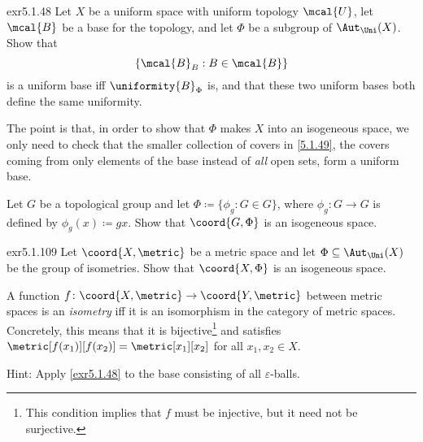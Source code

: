 \begin{exr}{}{exr5.1.48}
Let $X$ be a uniform space with uniform topology $\mcal{U}$, let $\mcal{B}$ be a base for the topology, and let $\Phi$ be a subgroup of $\Aut _{\Uni}(X)$.  Show that
\begin{equation}\label{5.1.49}
\left\{ \mcal{B}_B:B\in \mcal{B}\right\}
\end{equation}
is a uniform base iff $\uniformity{B}_\Phi$ is, and that these two uniform bases both define the same uniformity.
\begin{rmk}
The point is that, in order to show that $\Phi$ makes $X$ into an isogeneous space, we only need to check that the smaller collection of covers in \eqref{5.1.49}, the covers coming from only elements of the base instead of \emph{all} open sets, form a uniform base.
\end{rmk}
\end{exr}
\begin{exr}{}{}
Let $G$ be a topological group and let $\Phi \coloneqq \{ \phi _g:G\in G\}$, where $\phi _g:G\rightarrow G$ is defined by $\phi _g(x)\coloneqq gx$.  Show that $\coord{G,\Phi}$ is an isogeneous space.
\end{exr}
\begin{exr}{}{exr5.1.109}
Let $\coord{X,\metric}$ be a metric space and let $\Phi \subseteq \Aut _{\Uni}(X)$ be the group of isometries.  Show that $\coord{X,\Phi}$ is an isogeneous space.
\begin{rmk}
A function $f\colon \coord{X,\metric}\rightarrow \coord{Y,\metric}$ between metric spaces is an \emph{isometry} iff it is an isomorphism in the category of metric spaces.  Concretely, this means that it is bijective\footnote{This condition implies that $f$ must be injective, but it need not be surjective.} and satisfies $\metric[f(x_1)][f(x_2)]=\metric[x_1][x_2]$ for all $x_1,x_2\in X$.
\end{rmk}
\begin{rmk}
Hint:  Apply \cref{exr5.1.48} to the base consisting of all $\varepsilon$-balls.
\end{rmk}
\end{exr}
